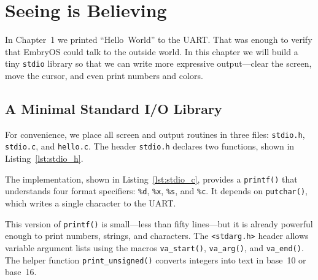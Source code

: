 \chapter{Seeing is Believing}

In Chapter~1 we printed ``Hello~World'' to the UART.  That was enough to verify
that EmbryOS could talk to the outside world.  In this chapter we will build a
tiny \texttt{stdio} library so that we can write more expressive output---clear
the screen, move the cursor, and even print numbers and colors.

\section{A Minimal Standard I/O Library}

For convenience, we place all screen and output routines in three files:
\texttt{stdio.h}, \texttt{stdio.c}, and \texttt{hello.c}.  The header
\texttt{stdio.h} declares two functions, shown in
Listing~\ref{lst:stdio_h}.

\begin{figure}[H]
\centering
\begin{minipage}{0.7\textwidth}

\end{minipage}
\end{figure}

The implementation, shown in Listing~\ref{lst:stdio_c}, provides a
\texttt{printf()} that understands four format specifiers:
\texttt{\%d}, \texttt{\%x}, \texttt{\%s}, and \texttt{\%c}.  It depends on
\texttt{putchar()}, which writes a single character to the UART.

\begin{figure}[H]
\centering
\begin{minipage}{0.9\textwidth}

\end{minipage}
\end{figure}

This version of \texttt{printf()} is small---less than fifty lines---but it is
already powerful enough to print numbers, strings, and characters.  The
\texttt{<stdarg.h>} header allows variable argument lists using the macros
\texttt{va\_start()}, \texttt{va\_arg()}, and \texttt{va\_end()}.  The helper
function \texttt{print\_unsigned()} converts integers into text in base~10 or
base~16.

